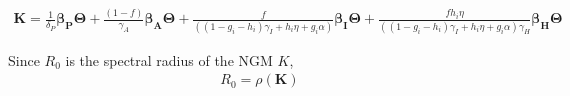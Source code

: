 \documentclass{article}
\begin{document}
\begin{gather*}
\boldsymbol{K} = \frac{1}{\delta_P} \boldsymbol{\beta_P} \boldsymbol{\Theta} + \frac{(1-f)}{\gamma_A} \boldsymbol{\beta_A} \boldsymbol{\Theta} + \frac{f}{((1-g_i-h_i) \gamma_{I} + h_i \eta + g_i \alpha)} \boldsymbol{\beta_I} \boldsymbol{\Theta} + \frac{fh_i \eta}{((1-g_i-h_i) \gamma_{I} + h_i \eta + g_i \alpha)\gamma_H} \boldsymbol{\beta_H} \boldsymbol{\Theta}
\end{gather*}

Since $R_0$ is the spectral radius of the NGM $K$,\\

\begin{gather}
R_0 = \rho(\boldsymbol{K})
\end{gather}
\end{document}
